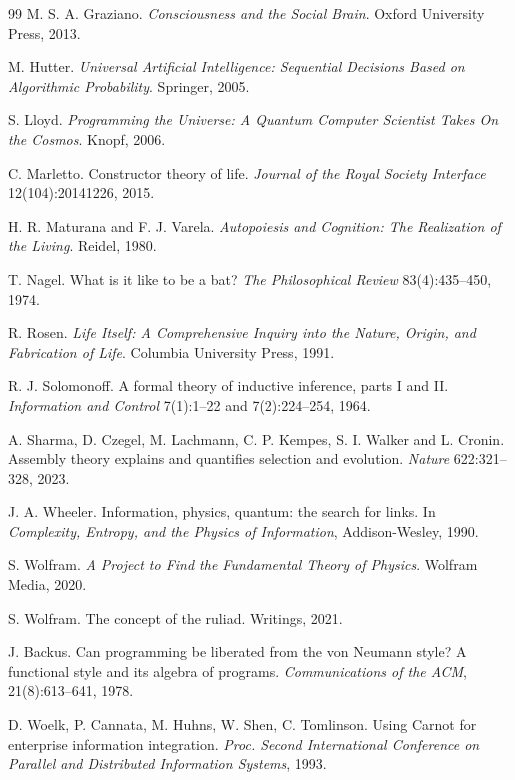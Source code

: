 \begin{thebibliography}{99}
 M. S. A. Graziano. \emph{Consciousness and the Social Brain}.
Oxford University Press, 2013.

 M. Hutter. \emph{Universal Artificial Intelligence: Sequential
Decisions Based on Algorithmic Probability}. Springer, 2005.

 S. Lloyd. \emph{Programming the Universe: A Quantum Computer
Scientist Takes On the Cosmos}. Knopf, 2006.

 C. Marletto. Constructor theory of life. \emph{Journal of the
Royal Society Interface} 12(104):20141226, 2015.

 H. R. Maturana and F. J. Varela. \emph{Autopoiesis and
Cognition: The Realization of the Living}. Reidel, 1980.

 T. Nagel. What is it like to be a bat? \emph{The Philosophical
Review} 83(4):435--450, 1974.

 R. Rosen. \emph{Life Itself: A Comprehensive Inquiry into the
Nature, Origin, and Fabrication of Life}. Columbia University Press, 1991.

 R. J. Solomonoff. A formal theory of inductive inference,
parts I and II. \emph{Information and Control} 7(1):1--22 and 7(2):224--254, 1964.

 A. Sharma, D. Czegel, M. Lachmann, C. P. Kempes, S. I. Walker and
L. Cronin. Assembly theory explains and quantifies selection and evolution.
\emph{Nature} 622:321--328, 2023.

 J. A. Wheeler. Information, physics, quantum: the search for
links. In \emph{Complexity, Entropy, and the Physics of Information}, Addison-Wesley,
1990.

 S. Wolfram. \emph{A Project to Find the Fundamental Theory of
Physics}. Wolfram Media, 2020.

 S. Wolfram. The concept of the ruliad. Writings, 2021.



J. Backus. Can programming be liberated from the von Neumann
style? A functional style and its algebra of programs. \emph{Communications of the
ACM}, 21(8):613--641, 1978.

D. Woelk, P. Cannata, M. Huhns, W. Shen, C. Tomlinson. Using
Carnot for enterprise information integration. \emph{Proc. Second International
Conference on Parallel and Distributed Information Systems}, 1993.


\end{thebibliography}

